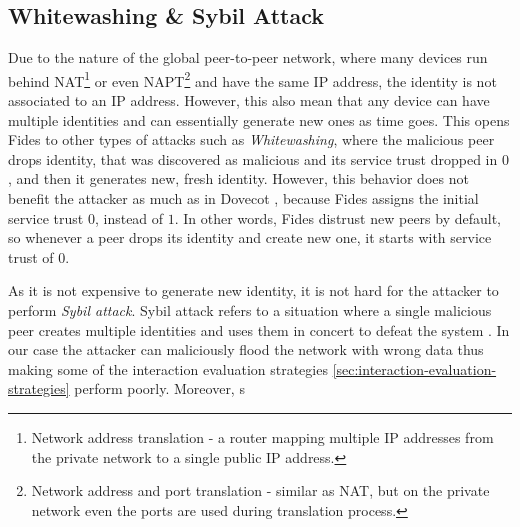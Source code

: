 \subsection{Whitewashing \& Sybil Attack}
Due to the nature of the global peer-to-peer network, where many devices run behind NAT\footnote{Network address translation - a router mapping multiple IP addresses from the private network to a single public IP address.} or even NAPT\footnote{Network address and port translation - similar as NAT, but on the private network even the ports are used during translation process.} and have the same IP address, the identity is not associated to an IP address.
However, this also mean that any device can have multiple identities and can essentially generate new ones as time goes.
This opens Fides to other types of attacks such as \textit{Whitewashing}, where the malicious peer drops identity, that was discovered as malicious and its service trust dropped in $0$, and then it generates new, fresh identity.
However, this behavior does not benefit the attacker as much as in Dovecot \cite{dita}, because Fides assigns the initial service trust $0$, instead of $1$.
In other words, Fides distrust new peers by default, so whenever a peer drops its identity and create new one, it starts with service trust of $0$.

As it is not expensive to generate new identity, it is not hard for the attacker to perform \textit{Sybil attack}.
Sybil attack refers to a situation where a single malicious peer creates multiple identities and uses them in concert to defeat the system \cite{sybil}.
In our case the attacker can maliciously flood the network with wrong data thus making some of the interaction evaluation strategies \ref{sec:interaction-evaluation-strategies} perform poorly.
Moreover, s